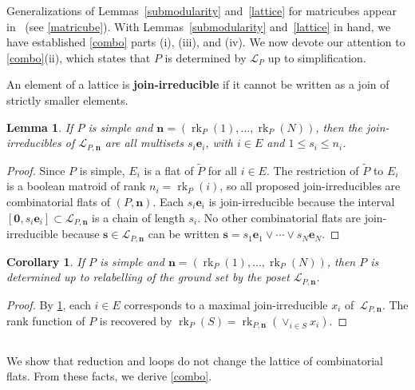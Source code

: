 \documentclass[11pt]{article}
\newtheorem{lemm}[theo]{Lemma}
\newtheorem{coro}[theo]{Corollary}
\theoremstyle{definition}
\numberwithin{equation}{section}
\DeclareMathOperator{\rk}{rk}
\newcommand{\word}[1]{\textbf{#1}}
\newcommand{\revision}[1]{{#1}}
\begin{document}
Generalizations of Lemmas~\ref{submodularity} and~\ref{lattice} for matricubes appear in~\cite[Theorem~3.4]{AG24} (see \cref{matricube}).
\revision{With Lemmas~\ref{submodularity} and~\ref{lattice} in hand, we have established \cref{combo} parts (i), (iii), and (iv). We now devote our attention to \cref{combo}(ii), which states that $P$ is determined by $\mathcal L_P$ up to simplification. }

\revision{An element of a lattice is \word{join-irreducible} if it cannot be written as a join of strictly smaller elements.}
\begin{lemm}\label{joinirreds}
  If $P$ is simple and $\mathbf n = (\rk_P(1), \ldots, \rk_P(N))$, then the join-irreducibles of $\mathcal L_{P, \mathbf n}$ are all multisets $s_i \mathbf e_i$, with $i \in E$ and $1 \leq s_i \leq n_i$.
\end{lemm}
\begin{proof}
  Since $P$ is simple, $E_i$ is a flat of $\widetilde P$ for all $i \in E$.
  The restriction of $\widetilde P$ to $E_i$ is a boolean matroid of rank $n_i = \rk_P(i)$, so all proposed join-irreducibles are combinatorial flats of $(P, \mathbf n)$.
  Each $s_i \mathbf e_i$ is join-irreducible because the interval $[\mathbf 0, s_i \mathbf e_i] \subset \mathcal L_{P, \mathbf n}$ is a chain of length $s_i$.
  No other combinatorial flats are join-irreducible because $\mathbf s \in \mathcal L_{P, \mathbf n}$ can be written $\mathbf s = s_1 \mathbf e_1 \vee \cdots \vee s_N \mathbf e_N$.
\end{proof}
\begin{coro}\label{determined}
  If $P$ is simple and $\mathbf n = (\rk_P(1), \ldots, \rk_P(N))$, then $P$ is determined up to relabelling of the ground set by the poset $\mathcal L_{P, \mathbf n}$.
\end{coro}
\begin{proof}
  By \cref{joinirreds}, each $i \in E$ corresponds to a maximal join-irreducible $x_i$ of~$\mathcal L_{P, \mathbf n}$.
  The rank function of $P$ is recovered by $\rk_P(S) = \rk_{P, \mathbf n}(\vee_{i \in S} x_i)$.
\end{proof}

\subsection{} \label{comboflatsimplification}
We show that reduction and loops do not change the lattice of combinatorial flats.
From these facts, we derive \cref{combo}.
\end{document}
